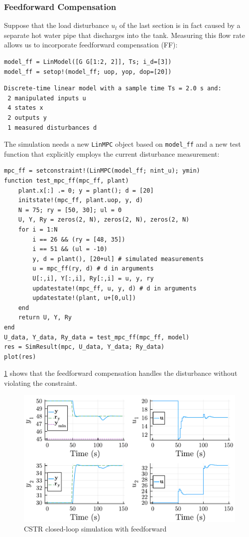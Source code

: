 \subsubsection{Feedforward Compensation}

Suppose that the load disturbance $u_l$ of the last section is in fact caused by a separate hot water pipe that discharges into the tank. Measuring this flow rate allows us to incorporate feedforward compensation (FF):

\begin{verbatim}
model_ff = LinModel([G G[1:2, 2]], Ts; i_d=[3])
model_ff = setop!(model_ff; uop, yop, dop=[20])
\end{verbatim}
\spacerepl
\begin{verbatim}
Discrete-time linear model with a sample time Ts = 2.0 s and:
 2 manipulated inputs u
 4 states x
 2 outputs y
 1 measured disturbances d
\end{verbatim}
The simulation needs a new \texttt{LinMPC} object based on \texttt{model\_ff} and a new test function that explicitly employs the current disturbance measurement:
\begin{verbatim}
mpc_ff = setconstraint!(LinMPC(model_ff; nint_u); ymin)
function test_mpc_ff(mpc_ff, plant)
    plant.x[:] .= 0; y = plant(); d = [20]
    initstate!(mpc_ff, plant.uop, y, d)
    N = 75; ry = [50, 30]; ul = 0
    U, Y, Ry = zeros(2, N), zeros(2, N), zeros(2, N)
    for i = 1:N
        i == 26 && (ry = [48, 35])
        i == 51 && (ul = -10)
        y, d = plant(), [20+ul] # simulated measurements
        u = mpc_ff(ry, d) # d in arguments
        U[:,i], Y[:,i], Ry[:,i] = u, y, ry
        updatestate!(mpc_ff, u, y, d) # d in arguments
        updatestate!(plant, u+[0,ul])
    end
    return U, Y, Ry
end
U_data, Y_data, Ry_data = test_mpc_ff(mpc_ff, model)
res = SimResult(mpc, U_data, Y_data; Ry_data)
plot(res)
\end{verbatim}

\cref{fig:plot2_LinMPC} shows that the feedforward compensation handles the disturbance without violating the constraint.

\begin{figure}
    \centering
    \includegraphics[width=\columnwidth]{fig/plot2_LinMPC.pdf}
    \caption{CSTR closed-loop simulation with feedforward}
    \label{fig:plot2_LinMPC}
\end{figure}

